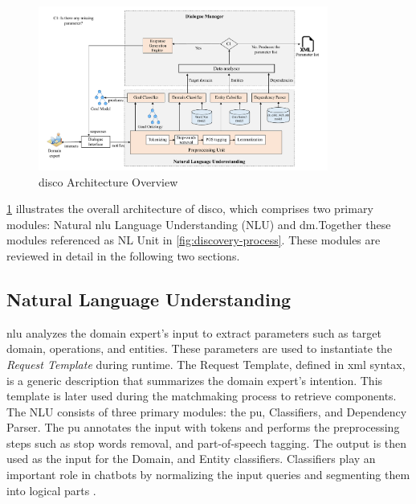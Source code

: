 \begin{figure}[hbt]
\hypertarget{fig:disco-arch}{%
\centering
\includegraphics[width=0.85\textwidth]{../figures/MyFigures/Overview.drawio.pdf}
\captionsetup{justification=centering}
\caption{\gls{disco} Architecture Overview}\label{fig:disco-arch}
}
\end{figure}

\cref{fig:disco-arch} illustrates the overall architecture of \gls{disco}, which comprises two primary modules: Natural \gls{nlu} Language Understanding (NLU) and \gls{dm}.Together these modules referenced as NL Unit in \cref{fig:discovery-process}. These modules are reviewed in detail in the following two sections.


\vspace{-10pt}
\hypertarget{sec:nlu}{%
\subsection{Natural Language Understanding}\label{sec:nlu}}
\vspace{10pt}

\gls{nlu} analyzes the domain expert's input to extract parameters such as
target domain, operations, and entities. These parameters are used to
instantiate the \emph{Request Template} during runtime. The Request
Template, defined in \gls{xml} syntax, is a generic description that
summarizes the domain expert's intention. This template is later used
during the matchmaking process to retrieve components. The NLU consists
of three primary modules: the \gls{pu}, Classifiers, and
Dependency Parser. The \gls{pu} annotates the input with tokens and performs
the preprocessing steps such as stop words removal, and part-of-speech
tagging. The output is then used as the input for the Domain, and Entity
classifiers. Classifiers play an important role in chatbots by
normalizing the input queries and segmenting them into logical parts
\autocite{Abdul-Kader2015}.

